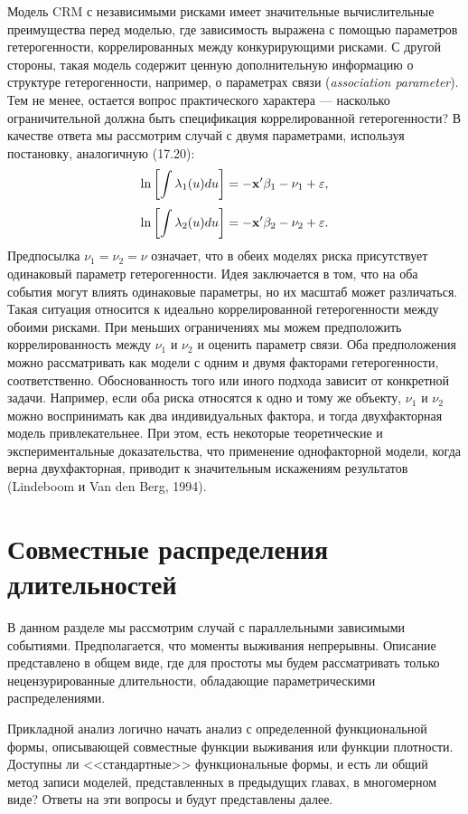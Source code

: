\noindent
Модель CRM с независимыми рисками имеет значительные вычислительные преимущества перед моделью, где зависимость выражена с помощью параметров гетерогенности, коррелированных между конкурирующими рисками. С другой стороны, такая модель содержит ценную дополнительную информацию о структуре гетерогенности, например, о параметрах связи (\textit{association parameter}). Тем не менее, остается вопрос практического характера --- насколько ограничительной должна быть спецификация коррелированной гетерогенности? В качестве ответа мы рассмотрим случай с двумя параметрами, используя постановку, аналогичную (17.20): %
    $$\ln\left[ \int \lambda_1(u)du \right] = -\mathbf{x}'\beta_1 - \nu_1 + \varepsilon,$$
    $$\ln\left[ \int \lambda_2(u)du \right] = -\mathbf{x}'\beta_2 - \nu_2 + \varepsilon.$$
Предпосылка $\nu_1 = \nu_2 = \nu$ означает, что в обеих моделях риска присутствует одинаковый параметр гетерогенности. Идея заключается в том, что на оба события могут влиять одинаковые параметры, но их масштаб может различаться. Такая ситуация относится к идеально коррелированной гетерогенности между обоими рисками. При меньших ограничениях мы можем предположить коррелированность между $\nu_1$ и $\nu_2$ и оценить параметр связи. Оба предположения можно рассматривать как модели с одним и двумя факторами гетерогенности, соответственно. Обоснованность того или иного подхода зависит от конкретной задачи. Например, если оба риска относятся к одно и тому же объекту, $\nu_1$ и $\nu_2$ можно воспринимать как два индивидуальных фактора, и тогда двухфакторная модель привлекательнее. При этом, есть некоторые теоретические и экспериментальные доказательства, что применение однофакторной модели, когда верна двухфакторная, приводит к значительным искажениям результатов (Lindeboom и Van den Berg, 1994).




\section{Совместные распределения длительностей}\label{sec:19.3}

\noindent
В данном разделе мы рассмотрим случай с параллельными зависимыми событиями. Предполагается, что моменты выживания непрерывны. Описание представлено в общем виде, где для простоты мы будем рассматривать только нецензурированные длительности, обладающие параметрическими распределениями.

Прикладной анализ логично начать анализ с определенной функциональной формы, описывающей совместные функции выживания или функции плотности. Доступны ли <<стандартные>> функциональные формы, и есть ли общий метод записи моделей, представленных в предыдущих главах, в многомерном виде? Ответы на эти вопросы и будут представлены далее.


